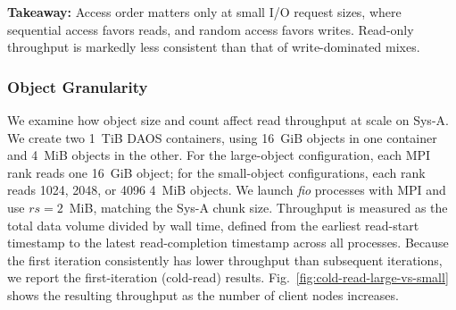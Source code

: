 


\begin{takeaway}
\textbf{Takeaway:} Access order matters only at small I/O request sizes, where sequential access favors reads, and random access favors writes. Read-only throughput is markedly less consistent than that of write-dominated mixes.
\end{takeaway}

\subsubsection{Object Granularity}

We examine how object size and count affect read throughput at scale on Sys-A. We create two 1~TiB DAOS containers, using 16~GiB objects in one container and 4~MiB objects in the other. For the large-object configuration, each MPI rank reads one 16~GiB object; for the small-object configurations, each rank reads 1024, 2048, or 4096 4~MiB objects. We launch \textit{fio} processes with MPI and use $rs{=}2$~MiB, matching the Sys-A chunk size. Throughput is measured as the total data volume divided by wall time, defined from the earliest read-start timestamp to the latest read-completion timestamp across all processes. Because the first iteration consistently has lower throughput than subsequent iterations, we report the first-iteration (cold-read) results. Fig.~\ref{fig:cold-read-large-vs-small} shows the resulting throughput as the number of client nodes increases.

